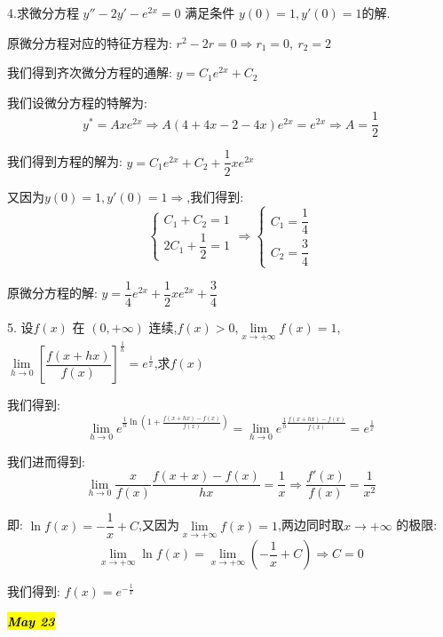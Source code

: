 4.求微分方程 $y''-2y'-e^{2x}=0$ 满足条件 $y(0)=1,y'(0)=1$的解.
\begin{solution}
	
	原微分方程对应的特征方程为: $r^2-2r=0\Rightarrow r_{1}=0,\ r_{2}=2$
	
	我们得到齐次微分方程的通解: $y=C_{1}e^{2x}+C_{2}$
	
	我们设微分方程的特解为: $$y^{*}=Axe^{2x}\Rightarrow A(4+4x-2-4x)e^{2x}=e^{2x}\Rightarrow A=\frac{1}{2}$$
	
	我们得到方程的解为: $y=C_{1}e^{2x}+C_{2}+\dfrac{1}{2}xe^{2x}$
	
	又因为$y(0)=1,y'(0)=1\Rightarrow$,我们得到: 
	$$\left\lbrace 
	\begin{array}{l}
		C_{1}+C_{2}=1\\
		2C_{1}+\dfrac{1}{2}=1
	\end{array}
	\right. \Rightarrow \left\lbrace 
	\begin{array}{l}
		C_{1}=\dfrac{1}{4}\\
		C_{2}=\dfrac{3}{4}
	\end{array}
	\right. $$
	
	原微分方程的解: $y=\dfrac{1}{4}e^{2x}+\dfrac{1}{2}xe^{2x}+\dfrac{3}{4}$
\end{solution}


5. 设$f(x)$ 在 $(0,+\infty)$ 连续,$f(x)>0$,$\lim\limits_{x\rightarrow  +\infty}f(x)=1$,$\lim\limits_{h\rightarrow 0}\left[\dfrac{f(x+hx)}{f(x)} \right]^{\frac{1}{h}}=e^{\frac{1}{x}} $,求$f(x)$
\begin{solution}
	
	我们得到: 
	$$\lim\limits_{h\rightarrow 0}e^{\frac{1}{h}\ln(1+\frac{f(x+hx)-f(x)}{f(x)})}=\lim\limits_{h\rightarrow 0}e^{\frac{1}{h}\frac{f(x+hx)-f(x)}{f(x)}}=e^{\frac{1}{x}}$$
	
	我们进而得到: 
	$$\lim\limits_{h\rightarrow 0}\frac{x}{f(x)}\frac{f(x+x)-f(x)}{hx}=\frac{1}{x}\Rightarrow \frac{f'(x)}{f(x)}=\frac{1}{x^2}$$
	
	即: $\ln f(x)=-\dfrac{1}{x}+C$,又因为$\lim\limits_{x\rightarrow  +\infty}f(x)=1$,两边同时取$x\rightarrow +\infty$ 的极限: 
	$$\lim\limits_{x\rightarrow +\infty}\ln f(x)=\lim\limits_{x\rightarrow +\infty}(-\frac{1}{x}+C)\Rightarrow C=0$$
	
	我们得到: $f(x)=e^{-\frac{1}{x}}$
\end{solution}


\hl{\textbf{\textit{May 23}}}

